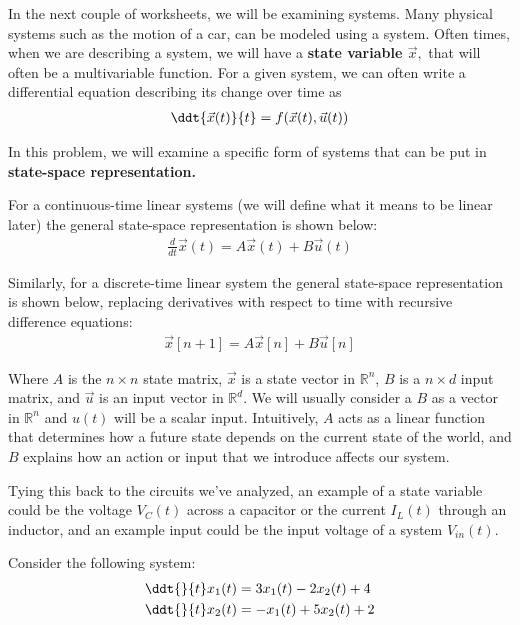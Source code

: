 

In the next couple of worksheets, we will be examining systems. 
Many physical systems such as the motion of a car, can be modeled using a system.
Often times, when we are describing a system, we will have a \textbf{state variable $\vec{x},$}
that will often be a multivariable function. 
For a given system, we can often write a differential equation describing its change over time as
\begin{align}
\ddt{\vec{x}(t)}{t} = f(\vec{x}(t), \vec{u}(t))
\end{align}

In this problem, we will examine a specific form of systems that can be put in \textbf{state-space representation.}

For a continuous-time linear systems (we will define what it means to be linear later) the general state-space representation is shown below:
\begin{align}
\frac{d}{dt} \vec{x}(t) = A \vec{x}(t) + B \vec{u}(t)
\end{align}

Similarly, for a discrete-time linear system the general state-space representation is shown below, replacing derivatives with respect to time with recursive difference equations:
\begin{align}
\vec{x}[n + 1] = A \vec{x}[n] + B \vec{u}[n]
\end{align}

Where $A$ is the $n \times n$ state matrix, $\vec{x}$ is a state vector in $\mathbb{R}^n$, $B$ is a $n \times d$ input matrix, and $\vec{u}$ is an input vector in $\mathbb{R}^d$. We will usually consider a $B$ as a vector in $\mathbb{R}^n$ and $u(t)$ will be a scalar input. Intuitively, $A$ acts as a linear function that determines how a future state depends on the current state of the world, and $B$ explains how an action or input that we introduce affects our system.

Tying this back to the circuits we've analyzed, an example of a state variable could be the voltage $V_C(t)$ across a capacitor or the current $I_L(t)$ through an inductor, and an example input could be the input voltage of a system $V_{in}(t)$.

Consider the following system:
\begin{align*}
    \ddt{}{t}x_{1}(t) &= 3 x_{1}(t) - 2 x_{2}(t) + 4 \\
    \ddt{}{t}x_{2}(t) &= - x_{1}(t) + 5 x_{2}(t) + 2
\end{align*}

